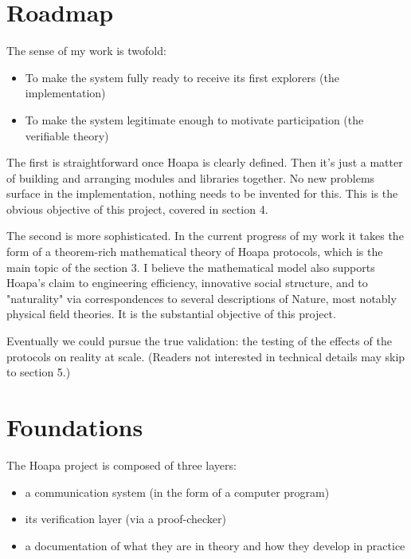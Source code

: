 \documentclass[11pt]{article}
\begin{document}
\section{Roadmap}

The sense of my work is twofold:

\begin{itemize}

\item To make the system fully ready to receive its first explorers (the implementation)

\item To make the system legitimate enough to motivate participation (the verifiable theory)

\end{itemize}

The first is straightforward once Hoapa is clearly defined. Then it's just a matter of building and arranging modules and libraries together. No new problems surface in the implementation, nothing needs to be invented for this. This is the obvious objective of this project, covered in section 4.

The second is more sophisticated. In the current progress of my work it takes the form of a theorem-rich mathematical theory of Hoapa protocols, which is the main topic of the section 3. I believe the mathematical model also supports Hoapa's claim to engineering efficiency, innovative social structure, and to "naturality" via correspondences to several descriptions of Nature, most notably physical field theories. It is the substantial objective of this project.

Eventually we could pursue the true validation: the testing of the effects of the protocols on reality at scale. (Readers not interested in technical details may skip to section 5.)

\section{Foundations}

The Hoapa project is composed of three layers:

\begin{itemize}

\item a communication system (in the form of a computer program)

\item its verification layer (via a proof-checker)

\item a documentation of what they are in theory and how they develop in practice

\end{itemize}
\end{document}
